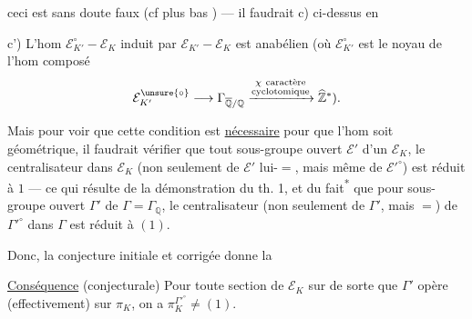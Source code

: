 ceci est sans doute faux (cf plus bas ) --- il faudrait    c) ci-dessus en

c') L'hom $\mathcal E_{K'}^\circ-\mathcal E_K$ induit par $\mathcal E_{K'}-\mathcal E_K$ est anabélien (où $\mathcal E_{K'}^\circ$ est le noyau de l'hom composé
\[
\mathcal E_{K'}^{\unsure{\circ}}\longrightarrow\Gamma_{\overline{\mathbb Q}/\mathbb Q}\xrightarrow{\substack{\chi\ \text{caractère}\\\text{cyclotomique}}}\widehat{\mathbb Z}^{*}).
\]

Mais pour voir que cette condition est \uline{nécessaire} pour que l'hom soit géométrique, il faudrait  vérifier que  tout sous-groupe ouvert $\mathcal E'$ d'un $\mathcal E_K$, le centralisateur dans $\mathcal E_K$ (non seulement de $\mathcal E'$ lui-$=$, mais même de $\mathcal E'^\circ$) est réduit à $1$ --- ce qui résulte de la démonstration du th. 1, et du fait\textsuperscript{*} que pour  sous-groupe ouvert $\Gamma'$ de $\Gamma=\Gamma_{\mathbb Q}$, le centralisateur (non seulement de $\Gamma'$, mais $=$) de $\Gamma'^\circ$ dans $\Gamma$ est réduit à $(1)$.

Donc, la conjecture initiale  et corrigée donne la

\uline{Conséquence} (conjecturale) Pour toute  section de $\mathcal E_K$ sur   de sorte que $\Gamma'$ opère (effectivement) sur $\pi_K$, on a  $\pi_K^{\Gamma'^\circ}\ne(1)$.

